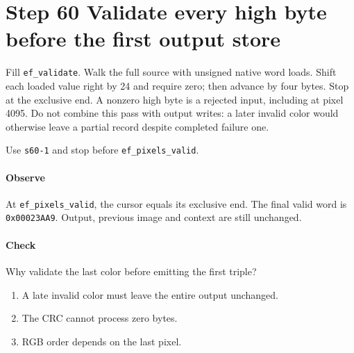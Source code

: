 \section{Step 60 Validate every high byte before the first output store}
Fill \texttt{ef\_validate}. Walk the full source with unsigned native word loads. Shift each loaded value right by 24 and require zero; then advance by four bytes. Stop at the exclusive end. A nonzero high byte is a rejected input, including at pixel 4095. Do not combine this pass with output writes: a later invalid color would otherwise leave a partial record despite completed failure one.

Use \texttt{s60-1} and stop before \texttt{ef\_pixels\_valid}.

\paragraph{Observe} At \texttt{ef\_pixels\_valid}, the cursor equals its exclusive end. The final valid word is \texttt{0x00023AA9}. Output, previous image and context are still unchanged.

\paragraph{Check} Why validate the last color before emitting the first triple?
\begin{enumerate}[label=\Alph*.]
  \item A late invalid color must leave the entire output unchanged.
  \item The CRC cannot process zero bytes.
  \item RGB order depends on the last pixel.
\end{enumerate}
